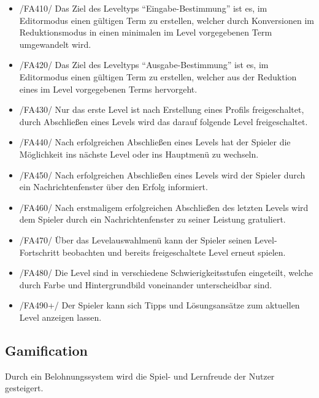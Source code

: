 \begin{itemize}
\item /FA410/ Das Ziel des Leveltyps "`Eingabe-Bestimmung"' ist es, im Editormodus einen gültigen Term zu erstellen, welcher durch Konversionen im Reduktionsmodus in einen minimalen im Level vorgegebenen Term umgewandelt wird.
\item /FA420/ Das Ziel des Leveltyps "`Ausgabe-Bestimmung"' ist es, im Editormodus einen gültigen Term zu erstellen, welcher aus der Reduktion eines im Level vorgegebenen Terms hervorgeht.
\item /FA430/ Nur das erste Level ist nach Erstellung eines Profils freigeschaltet, durch Abschließen eines Levels wird das darauf folgende Level freigeschaltet.
\item /FA440/ Nach erfolgreichen Abschließen eines Levels hat der Spieler die Möglichkeit ins nächste Level oder ins Hauptmenü zu wechseln.
\item /FA450/ Nach erfolgreichen Abschließen eines Levels wird der Spieler durch ein Nachrichtenfenster über den Erfolg informiert.
\item /FA460/ Nach erstmaligem erfolgreichen Abschließen des letzten Levels wird dem Spieler durch ein Nachrichtenfenster zu seiner Leistung gratuliert.
\item /FA470/ Über das Levelauswahlmenü kann der Spieler seinen Level-Fortschritt beobachten und bereits freigeschaltete Level erneut spielen.
\item /FA480/ Die Level sind in verschiedene Schwierigkeitsstufen eingeteilt, welche durch Farbe und Hintergrundbild voneinander unterscheidbar sind.
\item /FA490+/ Der Spieler kann sich Tipps und Lösungsansätze zum aktuellen Level anzeigen lassen.
\end{itemize}

\subsection{Gamification}

Durch ein Belohnungssystem wird die Spiel- und Lernfreude der Nutzer gesteigert.

